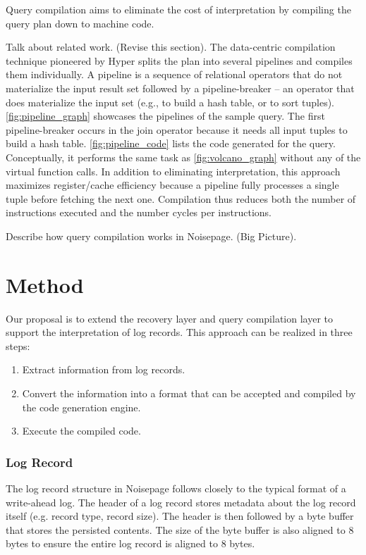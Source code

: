 \documentclass[12pt]{cmuthesis}
\begin{document}
Query compilation aims to eliminate the cost of interpretation by compiling the query plan down to machine code.

Talk about related work. (Revise this section).
The data-centric compilation technique pioneered by Hyper \cite{hyper_llvm} splits the plan into several pipelines and compiles them individually. A pipeline is a sequence of relational operators that do not materialize the input result set followed by a pipeline-breaker -- an operator that does materialize the input set (e.g., to build a hash table, or to sort tuples). \cref{fig:pipeline_graph} showcases the pipelines of the sample query. The first pipeline-breaker occurs in the join operator because it needs all input tuples to build a hash table. \cref{fig:pipeline_code} lists the code generated for the query. Conceptually, it performs the same task as \cref{fig:volcano_graph} without any of the virtual function calls. In addition to eliminating interpretation, this approach maximizes register/cache efficiency because a pipeline fully processes a single tuple before fetching the next one. Compilation thus reduces both the number of instructions executed and the number cycles per instructions.

Describe how query compilation works in Noisepage. (Big Picture).

\chapter{Method}

Our proposal is to extend the recovery layer and query compilation layer to support the interpretation of log records. This approach can be realized in three steps:
\begin{enumerate}
\item Extract information from log records.
\item Convert the information into a format that can be accepted and compiled by the code generation engine.
\item Execute the compiled code.
\end{enumerate}

\subsection{Log Record}
The log record structure in Noisepage follows closely to the typical format of a write-ahead log. The header of a log record stores metadata about the log record itself (e.g. record type, record size). The header is then followed by a byte buffer that stores the persisted contents. The size of the byte buffer is also aligned to 8 bytes to ensure the entire log record is aligned to 8 bytes.
\end{document}
